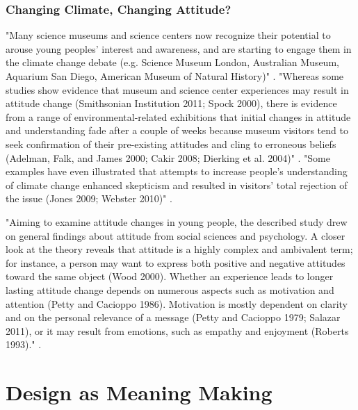\subsubsection{Changing Climate, Changing Attitude?}

"Many science museums and science centers now recognize their potential to arouse young peoples’ interest and awareness, and are starting to engage them in the climate change debate (e.g. Science Museum London, Australian Museum, Aquarium San Diego, American Museum of Natural History)" \autocite[p. 95]{gorr_changing_2014}. "Whereas some studies show evidence that museum and science center experiences may result in attitude change (Smithsonian Institution 2011; Spock 2000), there is evidence from a range of environmental-related exhibitions that initial changes in attitude and understanding fade after a couple of weeks because museum visitors tend to seek confirmation of their pre-existing attitudes and cling to erroneous beliefs (Adelman, Falk, and James 2000; Cakir 2008; Dierking et al. 2004)" \autocite[p. 95]{gorr_changing_2014}. "Some examples have even illustrated that attempts to increase people’s understanding of climate change enhanced skepticism and resulted in visitors’ total rejection of the issue (Jones 2009; Webster 2010)" \autocite[p. 96]{gorr_changing_2014}.

"Aiming to examine attitude changes in young people, the described study drew on general findings about attitude from social sciences and psychology. A closer look at the theory reveals that attitude is a highly complex and ambivalent term; for instance, a person may want to express both positive and negative attitudes toward the same object (Wood 2000). Whether an experience leads to longer lasting attitude change depends on numerous aspects such as motivation and attention (Petty and Cacioppo 1986). Motivation is mostly dependent on clarity and on the personal relevance of a message (Petty and Cacioppo 1979; Salazar 2011), or it may result from emotions, such as empathy and enjoyment (Roberts 1993)." \autocite[p. 96]{gorr_changing_2014}.



\section{Design as Meaning Making}

